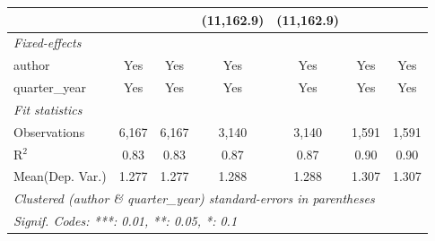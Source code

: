\begin{tabular}{lcccccc}
                                         &                &                & (11,162.9)    & (11,162.9)    &                &   \\   
   \midrule
   \emph{Fixed-effects}\\
   author                                & Yes            & Yes            & Yes           & Yes           & Yes            & Yes\\  
   quarter\_year                         & Yes            & Yes            & Yes           & Yes           & Yes            & Yes\\  
   \midrule
   \emph{Fit statistics}\\
   Observations                          & 6,167          & 6,167          & 3,140         & 3,140         & 1,591          & 1,591\\  
   R$^2$                                 & 0.83           & 0.83           & 0.87          & 0.87          & 0.90           & 0.90\\  
Mean(Dep. Var.) & 1.277 & 1.277 & 1.288 & 1.288 & 1.307 & 1.307 \\
   \midrule \midrule
   \multicolumn{7}{l}{\emph{Clustered (author \& quarter\_year) standard-errors in parentheses}}\\
   \multicolumn{7}{l}{\emph{Signif. Codes: ***: 0.01, **: 0.05, *: 0.1}}\\
\end{tabular}
\par\endgroup
